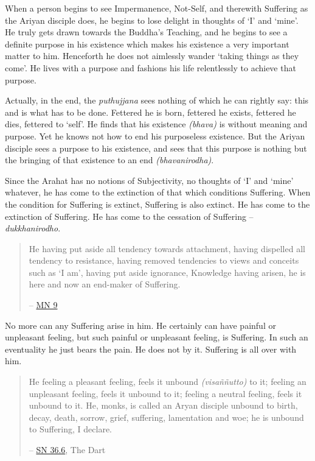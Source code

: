 When a person begins to see Impermanence, Not-Self, and therewith Suffering as the Ariyan disciple does, he begins to lose delight in thoughts of `I' and `mine'. He truly gets drawn towards the Buddha's Teaching, and he begins to see a definite purpose in his existence which makes his existence a very important matter to him. Henceforth he does not aimlessly wander `taking things as they come'. He lives with a purpose and fashions his life relentlessly to achieve that purpose.

Actually, in the end, the \emph{puthujjana} sees nothing of which he can rightly say: this and  is what has to be done. Fettered he is born, fettered he exists, fettered he dies, fettered to `self'. He finds that his existence \emph{(bhava)} is without meaning and purpose. Yet he knows not how to end his purposeless existence. But the Ariyan disciple sees a purpose to his existence, and sees that this purpose is nothing but the bringing of that existence to an end \emph{(bhavanirodha)}.

Since the Arahat has no notions of Subjectivity, no thoughts of `I' and `mine' whatever, he has come to the extinction of that which conditions Suffering. When the condition for Suffering is extinct, Suffering is also extinct. He has come to the extinction of Suffering. He has come to the cessation of Suffering -- \emph{dukkhanirodho}.

\begin{quote}
He having put aside all tendency towards attachment, having dispelled all tendency to resistance, having removed tendencies to views and conceits such as `I am', having put aside ignorance, Knowledge having arisen, he is here and now an end-maker of Suffering.

 -- \href{https://suttacentral.net/mn9/en/bodhi}{MN 9}
\end{quote}

No more can any Suffering arise in him. He certainly can have painful or unpleasant feeling, but such painful or unpleasant feeling, is  Suffering. In such an eventuality he just bears the pain. He does not  by it. Suffering is all over with him.

\begin{quote}
He feeling a pleasant feeling, feels it unbound \emph{(visaññutto)} to it; feeling an unpleasant feeling, feels it unbound to it; feeling a neutral feeling, feels it unbound to it. He, monks, is called an Aryan disciple unbound to birth, decay, death, sorrow, grief, suffering, lamentation and woe; he is unbound to Suffering, I declare.

 -- \href{https://suttacentral.net/sn36.6/en/bodhi}{SN 36.6}, The Dart
\end{quote}


